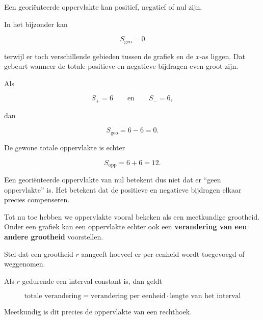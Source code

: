 \documentclass{ximera}
\begin{document}
\begin{eigenschap}
Een georiënteerde oppervlakte kan positief, negatief of nul zijn.

In het bijzonder kan

\[
S_{\mathrm{geo}}=0
\]

terwijl er toch verschillende gebieden tussen de grafiek en de
\(x\)-as liggen. Dat gebeurt wanneer de totale positieve en negatieve
bijdragen even groot zijn.
\end{eigenschap}

\begin{voorbeeld}

Als

\[
S_+=6
\qquad\text{en}\qquad
S_-=6,
\]

dan

\[
S_{\mathrm{geo}}=6-6=0.
\]

De gewone totale oppervlakte is echter

\[
S_{\mathrm{opp}}=6+6=12.
\]

Een georiënteerde oppervlakte van nul betekent dus niet dat er
``geen oppervlakte'' is. Het betekent dat de positieve en negatieve
bijdragen elkaar precies compenseren.
\end{voorbeeld}




Tot nu toe hebben we oppervlakte vooral bekeken als een meetkundige
grootheid. Onder een grafiek kan een oppervlakte echter ook een
\textbf{verandering van een andere grootheid} voorstellen.

Stel dat een grootheid \(r\) aangeeft hoeveel er per eenheid wordt
toegevoegd of weggenomen.

Als \(r\) gedurende een interval constant is, dan geldt

\[
\boxed{
\text{totale verandering}
=
\text{verandering per eenheid}
\cdot
\text{lengte van het interval}
}
\]

Meetkundig is dit precies de oppervlakte van een rechthoek.

\begin{center}
\end{center}
\end{document}
